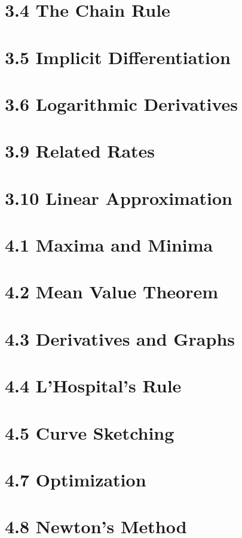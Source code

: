 \documentclass[
	landscape    = true,
	lecture-caps = {1.0, 1.0, 1.0},
	quiz-days    = F,
]{schedule}
\begin{document}
\begin{schedule}
	\section[2]{3.4 The Chain Rule}
	\section{3.5 Implicit Differentiation}
	\section{3.6 Logarithmic Derivatives}
	\section{3.9 Related Rates}
	\section{3.10 Linear Approximation}
	\examreview
	\exam[noquiz]

	\section{4.1 Maxima and Minima}
	\section{4.2 Mean Value Theorem}
	\section[2]{4.3 Derivatives and Graphs}
	\section{4.4 L'Hospital's Rule}
	\section{4.5 Curve Sketching}
	\section{4.7 Optimization}
	\section{4.8 Newton's Method}
	\examreview
	\exam[noquiz]


\end{schedule}
\end{document}
